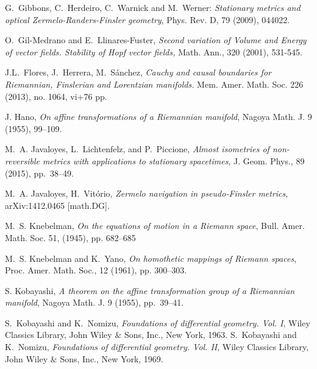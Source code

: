 \documentclass[reqno,10pt]{amsart}
\begin{document}
\begin{thebibliography}{10}
   {\sc G.~Gibbons, C.~Herdeiro, C.~Warnick and M.~Werner: {\em Stationary metrics
and optical Zermelo-Randers-Finsler geometry}}, Phys. Rev. D, 79
(2009), 044022.
  
   {\sc O.~Gil-Medrano and E.~Llinares-Fuster}, {\em Second variation of
Volume and Energy of vector fields. Stability of Hopf vector fields,}  Math.
Ann., 320 (2001), 531-545.

 {\sc J.L.~Flores, J.~Herrera, M.~S\'anchez}, 
{\em Cauchy and causal boundaries for Riemannian, Finslerian and Lorentzian manifolds.} Mem. Amer. Math. Soc. 226 (2013), no. 1064, vi+76 pp. 


 {\sc J.
Hano}, {\em On affine transformations of a Riemannian manifold}, Nagoya Math. J. 9
(1955), 99--109.

{\sc M.~A. Javaloyes, L.~Lichtenfelz, and P.~Piccione}, {\em Almost isometries
  of non-reversible metrics with applications to stationary spacetimes}, J.
  Geom. Phys., 89 (2015), pp.~38--49.

 {\sc M.~A. Javaloyes, H.~Vit\'orio}, {\em Zermelo navigation in pseudo-Finsler metrics}, 	arXiv:1412.0465 [math.DG].


 {\sc M.~S. Knebelman}, {\em On the equations of motion in a Riemann space}, 
Bull. Amer. Math. Soc. 51, (1945), pp. 682--685


 {\sc M.~S. Knebelman and K.~Yano},
      {\em On homothetic mappings of {R}iemann spaces},
   Proc. Amer. Math. Soc., 12 (1961), pp. 300--303.


{\sc S. Kobayashi}, {\em A theorem on the affine transformation group of a Riemannian manifold}, Nagoya Math. J. 9 (1955), pp.~39--41. 

     

 {\sc S.~Kobayashi and K.~Nomizu},
{\em Foundations of differential geometry. {V}ol. {I}},
    Wiley Classics Library, John Wiley \& Sons, Inc.,  New York,
      1963.
 {\sc S.~Kobayashi and K.~Nomizu},
{\em Foundations of differential geometry. {V}ol. {II}},
    Wiley Classics Library, John Wiley \& Sons, Inc.,  New York,
      1969.

%
%  
%
%
%


\end{thebibliography}
\end{document}
